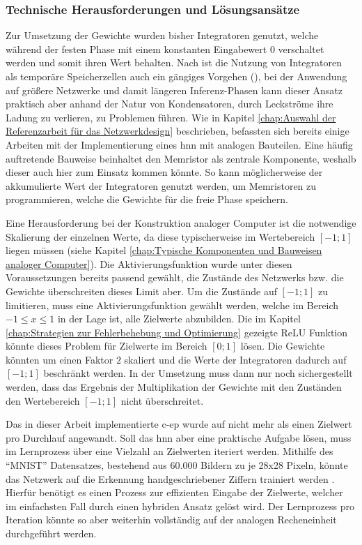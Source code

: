 \subsubsection{Technische Herausforderungen und Lösungsansätze}
\label{chap:Technische Herausforderungen und Lösungsansätze}

Zur Umsetzung der Gewichte wurden bisher Integratoren genutzt, welche während der festen Phase mit einem konstanten Eingabewert \(0\) verschaltet werden und somit ihren Wert behalten. Nach \citeauthor{Ulmann2022} ist die Nutzung von Integratoren als temporäre Speicherzellen auch ein gängiges Vorgehen (\cite[vgl. S. 92]{Ulmann2022}), bei der Anwendung auf größere Netzwerke und damit längeren Inferenz-Phasen kann dieser Ansatz praktisch aber anhand der Natur von Kondensatoren, durch Leckströme ihre Ladung zu verlieren, zu Problemen führen. Wie in Kapitel \ref{chap:Auswahl der Referenzarbeit für das Netzwerkdesign} beschrieben, befassten sich bereits einige Arbeiten mit der Implementierung eines \ac{hnn} mit analogen Bauteilen. Eine häufig auftretende Bauweise beinhaltet den Memristor als zentrale Komponente, weshalb dieser auch hier zum Einsatz kommen könnte. So kann möglicherweise der akkumulierte Wert der Integratoren genutzt werden, um Memristoren zu programmieren, welche die Gewichte für die freie Phase speichern.

Eine Herausforderung bei der Konstruktion analoger Computer ist die notwendige Skalierung der einzelnen Werte, da diese typischerweise im Wertebereich \([-1;1]\) liegen müssen (siehe Kapitel \ref{chap:Typische Komponenten und Bauweisen analoger Computer}). Die Aktivierungsfunktion wurde unter diesen Voraussetzungen bereits passend gewählt, die Zustände des Netzwerks bzw. die Gewichte überschreiten dieses Limit aber. Um die Zustände auf \([-1;1]\) zu limitieren, muss eine Aktivierungsfunktion gewählt werden, welche im Bereich \(-1\leq x\leq 1\) in der Lage ist, alle Zielwerte abzubilden. Die im Kapitel \ref{chap:Strategien zur Fehlerbehebung und Optimierung} gezeigte ReLU Funktion könnte dieses Problem für Zielwerte im Bereich \([0;1]\) lösen. Die Gewichte könnten \zb um einen Faktor \(2\) skaliert und die Werte der Integratoren dadurch auf \([-1;1]\) beschränkt werden. In der Umsetzung muss dann nur noch sichergestellt werden, dass das Ergebnis der Multiplikation der Gewichte mit den Zuständen den Wertebereich \([-1;1]\) nicht überschreitet.

Das in dieser Arbeit implementierte \ac{c-ep} wurde auf nicht mehr als einen Zielwert pro Durchlauf angewandt. Soll das \ac{hnn} aber eine praktische Aufgabe lösen, muss im Lernprozess über eine Vielzahl an Zielwerten iteriert werden. Mithilfe des "`MNIST"' Datensatzes, bestehend aus 60.000 Bildern zu je 28x28 Pixeln, könnte das Netzwerk \zb auf die Erkennung handgeschriebener Ziffern trainiert werden \cite{Deng2012}. Hierfür benötigt es einen Prozess zur effizienten Eingabe der Zielwerte, welcher im einfachsten Fall durch einen hybriden Ansatz gelöst wird. Der Lernprozess pro Iteration könnte so aber weiterhin vollständig auf der analogen Recheneinheit durchgeführt werden.

